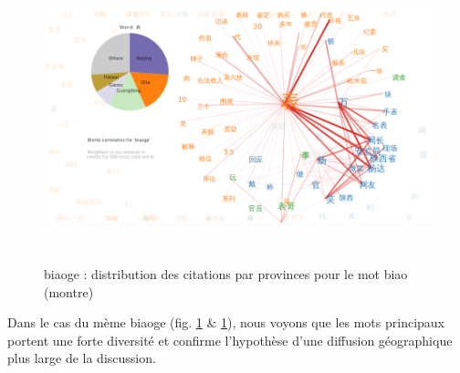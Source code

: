 \begin{figure}[h!]
  \centering
  \includegraphics[width=6.0087in,height=3.3386in]{figures/chap4/chapitre4-img60.png}
  \caption{
     biaoge : distribution des citations par provinces pour le mot biao (montre)
  }
  \label{fig:biaoge-words-pie-biao}
\end{figure}


Dans le cas du mème biaoge (fig. \ref{fig:biaoge-words-pie-biao} \& \ref{fig:biaoge-words-pie-biao}), nous voyons que les mots principaux portent une forte diversité et confirme l{\textquoteright}hypothèse d{\textquoteright}une diffusion géographique plus large de la discussion.


